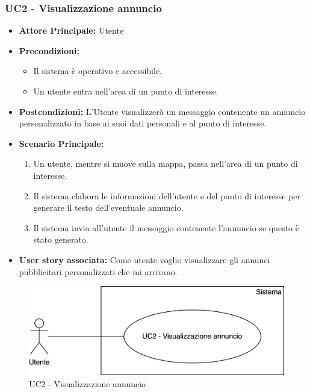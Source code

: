 \documentclass[11pt]{article}
\begin{document}
\begin{justify}
\subsubsection{\textbf{UC2 - Visualizzazione annuncio}}
\begin{itemize}
    \item \textbf{Attore Principale:} Utente
    \item \textbf{Precondizioni:} 
        \begin{itemize}
    	\item Il sistema è operativo e accessibile.
    	\item Un utente entra nell'area di un punto di interesse.
        \end{itemize}
    \item \textbf{Postcondizioni:} L'Utente visualizzerà un messaggio contenente un annuncio personalizzato in base ai suoi dati personali e al punto di interesse.
    \item \textbf{Scenario Principale:} 
        \begin{enumerate}
            \item Un utente, mentre si muove sulla mappa, passa nell'area di un punto di interesse.
            \item Il sistema elabora le informazioni dell'utente e del punto di interesse per generare il testo dell'eventuale annuncio.
            \item Il sistema invia all'utente il messaggio contenente l'annuncio se questo è stato generato.
        \end{enumerate}
    \item \textbf{User story associata:} Come utente voglio visualizzare gli annunci pubblicitari personalizzati che mi arrivano.
\end{itemize}
\begin{figure}[H]
    \centering
    \includegraphics[width=0.5\linewidth]{UC2image.png}
    \caption{UC2 - Visualizzazione annuncio}
    \label{fig:UC2}
\end{figure}

\end{justify}
\end{document}
